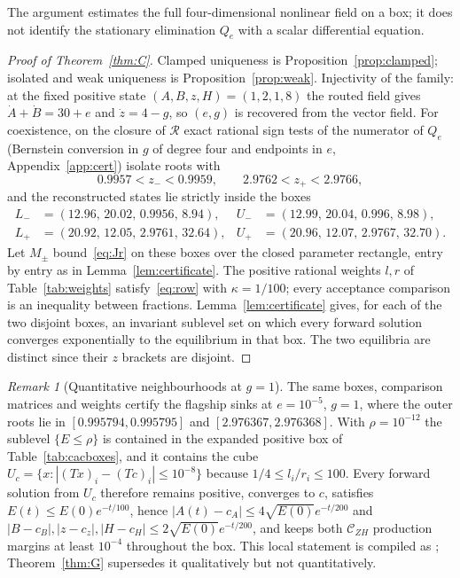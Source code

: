 \documentclass[11pt,a4paper]{article}
\theoremstyle{plain}
\theoremstyle{definition}
\theoremstyle{remark}
\newtheorem{remark}[theorem]{Remark}
\newcommand{\Rr}{\mathcal{R}}
\newcommand{\cZH}{\mathcal{C}_{ZH}}
\begin{document}
The argument estimates the full four-dimensional nonlinear field on a box; it does not identify the stationary elimination $Q_e$ with a scalar differential equation.

\begin{proof}[Proof of Theorem~\ref{thm:C}]
Clamped uniqueness is Proposition~\ref{prop:clamped}; isolated and weak uniqueness is Proposition~\ref{prop:weak}. Injectivity of the family: at the fixed positive state $(A,B,z,H)=(1,2,1,8)$ the routed field gives $\dot A+\dot B=30+e$ and $\dot z=4-g$, so $(e,g)$ is recovered from the vector field. For coexistence, on the closure of $\Rr$ exact rational sign tests of the numerator of $Q_e$ (Bernstein conversion in $g$ of degree four and endpoints in $e$, Appendix~\ref{app:cert}) isolate roots with
\[
0.9957<z_-<0.9959,\qquad 2.9762<z_+<2.9766,
\]
and the reconstructed states lie strictly inside the boxes
\begin{align*}
L_-&=(12.96,\,20.02,\,0.9956,\,8.94),&U_-&=(12.99,\,20.04,\,0.996,\,8.98),\\
L_+&=(20.92,\,12.05,\,2.9761,\,32.64),&U_+&=(20.96,\,12.07,\,2.9767,\,32.70).
\end{align*}
Let $M_\pm$ bound~\eqref{eq:Jr} on these boxes over the closed parameter rectangle, entry by entry as in Lemma~\ref{lem:certificate}. The positive rational weights $l,r$ of Table~\ref{tab:weights} satisfy~\eqref{eq:row} with $\kappa=1/100$; every acceptance comparison is an inequality between fractions. Lemma~\ref{lem:certificate} gives, for each of the two disjoint boxes, an invariant sublevel set on which every forward solution converges exponentially to the equilibrium in that box. The two equilibria are distinct since their $z$ brackets are disjoint.
\end{proof}

\begin{remark}[Quantitative neighbourhoods at $g=1$]\label{rem:cac}
The same boxes, comparison matrices and weights certify the flagship sinks at $e=10^{-5}$, $g=1$, where the outer roots lie in $[0.995794,0.995795]$ and $[2.976367,2.976368]$. With $\rho=10^{-12}$ the sublevel $\{E\le\rho\}$ is contained in the expanded positive box of Table~\ref{tab:cacboxes}, and it contains the cube $U_c=\{x:|(Tx)_i-(Tc)_i|\le10^{-8}\}$ because $1/4\le l_i/r_i\le100$. Every forward solution from $U_c$ therefore remains positive, converges to $c$, satisfies $E(t)\le E(0)e^{-t/100}$, hence $|A(t)-c_A|\le4\sqrt{E(0)}e^{-t/200}$ and $|B-c_B|,|z-c_z|,|H-c_H|\le2\sqrt{E(0)}e^{-t/200}$, and keeps both $\cZH$ production margins at least $10^{-4}$ throughout the box. This local statement is compiled as ; Theorem~\ref{thm:G} supersedes it qualitatively but not quantitatively.
\end{remark}
\end{document}
